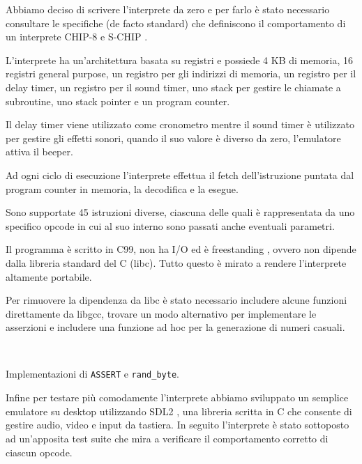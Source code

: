 \documentclass[a4paper]{article}
\begin{document}
Abbiamo deciso di scrivere l'interprete da zero e per farlo è stato necessario consultare
le specifiche (de facto standard) che definiscono il comportamento di un interprete CHIP-8
\cite{cowgod:chip8} e S-CHIP \cite{cowgod:schip}.

L'interprete ha un'architettura basata su registri e possiede 4 KB di memoria, 16 registri
general purpose, un registro per gli indirizzi di memoria, un registro per il delay timer,
un registro per il sound timer, uno stack per gestire le chiamate a subroutine, uno stack pointer
e un program counter.

Il delay timer viene utilizzato come cronometro mentre il sound
timer è utilizzato per gestire gli effetti sonori, quando il suo
valore è diverso da zero, l'emulatore attiva il beeper.

Ad ogni ciclo di esecuzione l'interprete effettua il fetch
dell'istruzione puntata dal program counter in memoria,
la decodifica e la esegue.

Sono supportate 45 istruzioni diverse, ciascuna delle
quali è rappresentata da uno specifico opcode in cui al suo interno
sono passati anche eventuali parametri.

Il programma è scritto in C99, non ha I/O ed è freestanding
\cite{n1256:conformance}, ovvero non dipende dalla libreria
standard del C (libc). Tutto questo è mirato a rendere l'interprete
altamente portabile.

Per rimuovere la dipendenza da libc è stato necessario includere
alcune funzioni direttamente da libgcc, trovare un modo alternativo
per implementare le asserzioni e includere una funzione ad hoc per
la generazione di numeri casuali.


\begin{Listing}[h!t]
    \centering
    \mbox{
        \quad
    }
    \caption{Implementazioni di \texttt{ASSERT} e \texttt{rand\_byte}.}
    \label{assert_rand}
\end{Listing}

Infine per testare più comodamente l'interprete abbiamo sviluppato
un semplice emulatore su desktop utilizzando SDL2
\cite{libsdl:about}, una libreria scritta in C che consente di
gestire audio, video e input da tastiera.
In seguito l'interprete è stato sottoposto ad un'apposita
test suite \cite{github:chip8-test-suite} che mira a verificare
il comportamento corretto di ciascun opcode.
\end{document}
